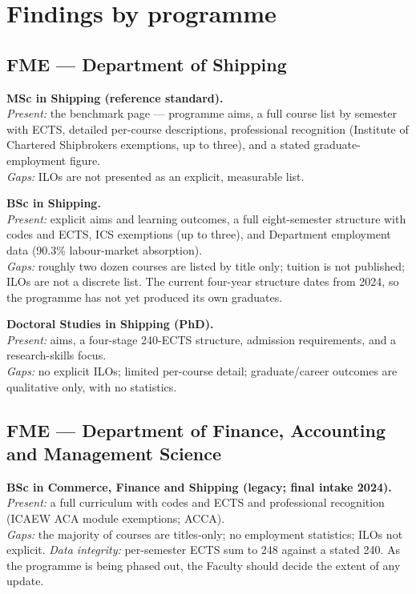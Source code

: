 \documentclass[11pt,a4paper]{article}
\begin{document}
\section{Findings by programme}

\subsection{FME --- Department of Shipping}

\textbf{MSc in Shipping (reference standard).}\\
\emph{Present:} the benchmark page --- programme aims, a full course list by semester with ECTS, detailed per-course descriptions, professional recognition (Institute of Chartered Shipbrokers exemptions, up to three), and a stated graduate-employment figure.\\
\emph{Gaps:} ILOs are not presented as an explicit, measurable list.

\textbf{BSc in Shipping.}\\
\emph{Present:} explicit aims and learning outcomes, a full eight-semester structure with codes and ECTS, ICS exemptions (up to three), and Department employment data (90.3\% labour-market absorption).\\
\emph{Gaps:} roughly two dozen courses are listed by title only; tuition is not published; ILOs are not a discrete list. The current four-year structure dates from 2024, so the programme has not yet produced its own graduates.

\textbf{Doctoral Studies in Shipping (PhD).}\\
\emph{Present:} aims, a four-stage 240-ECTS structure, admission requirements, and a research-skills focus.\\
\emph{Gaps:} no explicit ILOs; limited per-course detail; graduate/career outcomes are qualitative only, with no statistics.

\subsection{FME --- Department of Finance, Accounting and Management Science}

\textbf{BSc in Commerce, Finance and Shipping (legacy; final intake 2024).}\\
\emph{Present:} a full curriculum with codes and ECTS and professional recognition (ICAEW ACA module exemptions; ACCA).\\
\emph{Gaps:} the majority of courses are titles-only; no employment statistics; ILOs not explicit. \emph{Data integrity:} per-semester ECTS sum to 248 against a stated 240. As the programme is being phased out, the Faculty should decide the extent of any update.
\end{document}
